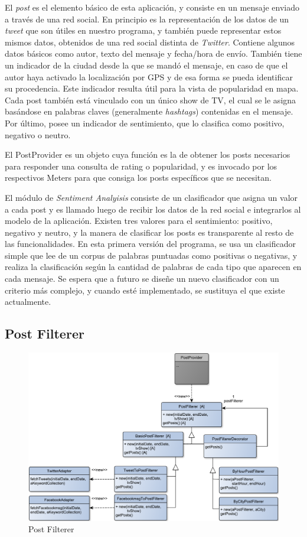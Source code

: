 El \emph{post} es el elemento básico de esta aplicación, y consiste en un mensaje enviado a través de una red social. En principio es la representación de los datos de un \emph{tweet} que son útiles en nuestro programa, y también puede representar estos mismos datos, obtenidos de una red social distinta de \emph{Twitter}. Contiene algunos datos básicos como autor, texto del mensaje y fecha/hora de envío. También tiene un indicador de la ciudad desde la que se mandó el mensaje, en caso de que el autor haya activado la localización por GPS y de esa forma se pueda identificar su procedencia. Este indicador resulta útil para la vista de popularidad en mapa. Cada post también está vinculado con un único show de TV, el cual se le asigna basándose en palabras claves (generalmente \emph{hashtags}) contenidas en el mensaje. Por último, posee un indicador de sentimiento, que lo clasifica como positivo, negativo o neutro.
\bigskip

El PostProvider es un objeto cuya función es la de obtener los posts necesarios para responder una consulta de rating o popularidad, y es invocado por los respectivos Meters para que consiga los posts específicos que se necesitan.
\bigskip

El módulo de \emph{Sentiment Analyisis} consiste de un clasificador que asigna un valor a cada post y es llamado luego de recibir los datos de la red social e integrarlos al modelo de la aplicación. Existen tres valores para el sentimiento: positivo, negativo y neutro, y la manera de clasificar los posts es transparente al resto de las funcionalidades. En esta primera versión del programa, se usa un clasificador simple que lee de un corpus de palabras puntuadas como positivas o negativas, y realiza la clasificación según la cantidad de palabras de cada tipo que aparecen en cada mensaje. Se espera que a futuro se diseñe un nuevo clasificador con un criterio más complejo, y cuando esté implementado, se sustituya el que existe actualmente.


\subsection{Post Filterer}

\begin{figure}[H]
\centering
\includegraphics[width=\textwidth]{graph/clase/filterer.pdf}
\caption{Post Filterer}
\end{figure}

